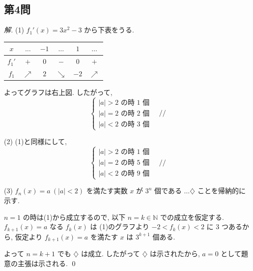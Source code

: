 \documentclass[../main.tex]{subfiles}
\begin{document}
\subsection*{第4問}

\begin{proof}[解]
  (1) $f_1'(x) = 3x^2 - 3$ から下表をうる.

  \begin{center}
    \begin{tabular}{|c|ccccc|}
      \hline
      $x$ & $\dots$ & $-1$ & $\dots$ & $1$ & $\dots$ \\ \hline
      $f_1'$ & $+$ & $0$ & $-$ & $0$ & $+$ \\ \hline
      $f_1$ & $\nearrow$ & $2$ & $\searrow$ & $-2$ & $\nearrow$ \\ \hline
    \end{tabular}
  \end{center}

  よってグラフは右上図. したがって,
  \[
    \begin{cases}
      |a| > 2 \text{ の時 } 1 \text{ 個} \\
      |a| = 2 \text{ の時 } 2 \text{ 個} \\
      |a| < 2 \text{ の時 } 3 \text{ 個}
    \end{cases} \quad \text{//}
  \]

  \medskip
  (2) (1)と同様にして,
  \[
    \begin{cases}
      |a| > 2 \text{ の時 } 1 \text{ 個} \\
      |a| = 2 \text{ の時 } 5 \text{ 個} \\
      |a| < 2 \text{ の時 } 9 \text{ 個}
    \end{cases} \quad \text{//}
  \]

  \medskip
  (3) $f_n(x) = a \ (|a| < 2)$ を満たす実数 $x$ が $3^n$ 個である $\dots \diamondsuit$ ことを帰納的に示す.

  $n=1$ の時は(1)から成立するので, 以下 $n=k \in \mathbb{N}$ での成立を仮定する. $f_{k+1}(x) = a$ なる $f_k(x)$ は (1)のグラフより $-2 < f_k(x) < 2$ に 3 つあるから, 仮定より $f_{k+1}(x) = a$ を満たす $x$ は $3^{k+1}$ 個ある.

  よって $n = k+1$ でも $\diamondsuit$ は成立. したがって $\diamondsuit$ は示されたから, $a=0$ として題意の主張は示される. \qed
\end{proof}

\begin{center}
\end{center}
\end{document}
